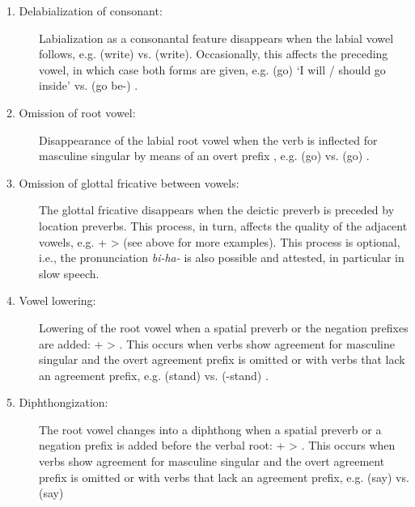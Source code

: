 \begin{description}
\item[1. Delabialization of consonant:] Labialization as a consonantal feature disappears when the labial vowel  follows, e.g.  (write) vs.  (write). Occasionally, this affects the preceding vowel, in which case both forms are given, e.g.  (go) `I will / should go inside' vs.  (go be-) .

\item[2. Omission of root vowel:] Disappearance of the labial root vowel when the verb is inflected for masculine singular by means of an overt prefix , e.g.  (go)  vs.  (go) .

\item[3. Omission of glottal fricative between vowels:] The glottal fricative disappears when the deictic preverb  is preceded by location preverbs. This process, in turn, affects the quality of the adjacent vowels, e.g.  +  >  (see  above for more examples). This process is optional, i.e., the pronunciation \textit{bi-ha-} is also possible and attested, in particular in slow speech.

\item[4. Vowel lowering:] Lowering of the root vowel  when a spatial preverb  or the negation prefixes  are added:  +  > . This occurs when verbs show agreement for masculine singular and the overt agreement prefix is omitted or with verbs that lack an agreement prefix, e.g.  (stand)  vs.  (-stand) .

\item[5. Diphthongization:] The root vowel  changes into a diphthong when a spatial preverb  or a negation prefix  is added before the verbal root:  +  > . This occurs when verbs show agreement for masculine singular and the overt agreement prefix is omitted or with verbs that lack an agreement prefix, e.g.  (say)  vs.  (say) 


\end{description}
